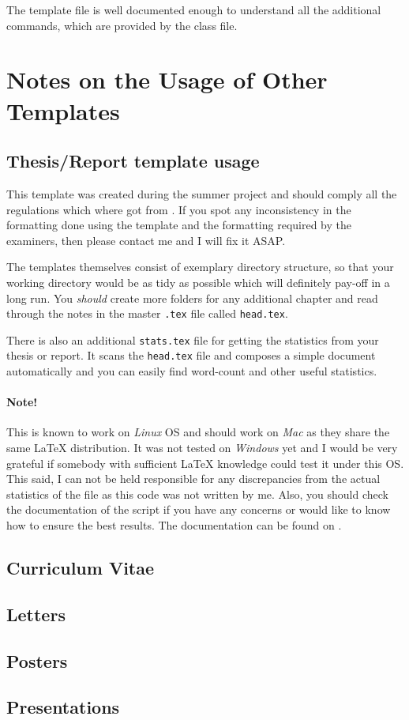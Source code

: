 The template file is well documented enough to understand all the additional
commands, which are provided by the class file.


\section{Notes on the Usage of Other Templates}

\subsection{Thesis/Report template usage}

This template was created during the summer project and should comply all the
regulations which where got from
.
%
If you spot any inconsistency in the formatting done using the template and the
formatting required by the examiners, then please contact me and I will fix it
ASAP.

The templates themselves consist of exemplary directory structure, so that your
working directory would be as tidy as possible which will definitely pay-off in
a long run.
%
You \emph{should} create more folders for any additional chapter and read
through the notes in the master \verb|.tex| file called \verb|head.tex|.

There is also an additional \verb|stats.tex| file for getting the statistics
from your thesis or report.
%
It scans the \verb|head.tex| file and composes a simple document automatically
and you can easily find word-count and other useful statistics.

\paragraph{Note!} This is known to work on \emph{Linux} OS and should work on
\emph{Mac} as they share the same \LaTeX{} distribution.
%
It was not tested on \emph{Windows} yet and I would be very grateful if somebody
with sufficient \LaTeX{} knowledge could test it under this OS.
%
This said, I can not be held responsible for any discrepancies from the actual
statistics of the file as this code was not written by me.
%
Also, you should check the documentation of the script if you have any concerns
or would like to know how to ensure the best results.
%
The documentation can be found on
.

\subsection{Curriculum Vitae}

\subsection{Letters}

\subsection{Posters}

\subsection{Presentations}






